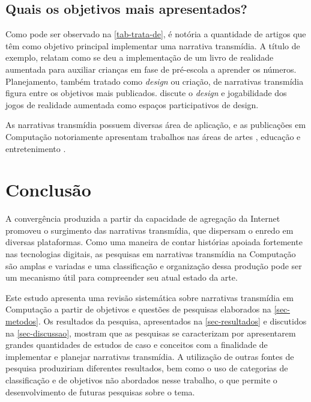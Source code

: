 \documentclass[
article,			%
11pt,				%
oneside,			%
a4paper,			%
english,			%
brazil,				%
sumario=tradicional
]{abntex2}
\begin{document}
  \subsection{Quais os objetivos mais apresentados?}

  Como pode ser observado na \autoref{tab-trata-de}, é notória a quantidade de artigos que têm como objetivo principal implementar uma narrativa transmídia. A título de exemplo,  relatam como se deu a implementação de um livro de realidade aumentada para auxiliar crianças em fase de pré-escola a aprender os números. Planejamento, também tratado como \textit{design} ou criação, de narrativas transmídia figura entre os objetivos mais publicados.  discute o \textit{design} e jogabilidade dos jogos de realidade aumentada como espaços participativos de design.

  As narrativas transmídia possuem diversas área de aplicação, e as publicações em Computação notoriamente apresentam trabalhos nas áreas de artes \cite{santorineos_2009,ha_2012,jung_2012,katifori_2014}, educação \cite{raybourn_2014,xiao_2013,mcauliffe_2011,ballagas_2011} e entretenimento \cite{willis_2013,choi_2010,evans_2014,nandakumar_2014,holler_2014,murakami_2015}.

  \section{Conclusão}

  A convergência produzida a partir da capacidade de agregação da Internet promoveu o surgimento das narrativas transmídia, que dispersam o enredo em diversas plataformas. Como uma maneira de contar histórias apoiada fortemente nas tecnologias digitais, as pesquisas em narrativas transmídia na Computação são amplas e variadas e uma classificação e organização dessa produção pode ser um mecanismo útil para compreender seu atual estado da arte.

  Este estudo apresenta uma revisão sistemática sobre narrativas transmídia em Computação a partir de objetivos e questões de pesquisas elaborados na \autoref{sec-metodos}. Os resultados da pesquisa, apresentados na \autoref{sec-resultados} e discutidos na \autoref{sec-discussao}, mostram que as pesquisas se caracterizam por apresentarem grandes quantidades de estudos de caso e conceitos com a finalidade de implementar e planejar narrativas transmídia. A utilização de outras fontes de pesquisa produziriam diferentes resultados, bem como o uso de categorias de classificação e de objetivos não abordados nesse trabalho, o que permite o desenvolvimento de futuras pesquisas sobre o tema.
\end{document}
